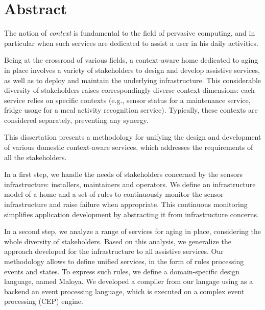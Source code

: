 \chapter*{Abstract}
\vspace*{-15mm}
\begin{center}
  \textsc{\mytitle}
\end{center}
\vspace*{-3mm}
\begin{small}
The notion of {\em context} is fundamental to the field of pervasive computing, and in particular when such services are dedicated to assist a user in his daily activities.

Being at the crossroad of various fields, a context-aware home dedicated to aging in place involves a variety of stakeholders to design and develop assistive services, as well as to deploy and maintain the underlying infrastructure. 
This considerable diversity of stakeholders raises correspondingly diverse context dimensions: each service relies on specific contexts (e.g., sensor status for a maintenance service, fridge usage for a meal activity recognition service). Typically, these contexts are considered separately, preventing any synergy.

This dissertation presents a methodology for unifying the design and development of various domestic context-aware services, which addresses the requirements of all the stakeholders. 

In a first step, we handle the needs of stakeholders concerned by the sensors infrastructure: installers, maintainers and operators. We define an infrastructure model of a home and a set of rules to continuously monitor the sensor infrastructure and raise failure when appropriate. This continuous monitoring simplifies application development by abstracting it from infrastructure concerns. 

In a second step, we analyze a range of services for aging in place, considering the whole diversity of stakeholders. Based on this analysis, we generalize the approach developed for the infrastructure to all assistive services. Our methodology allows to define unified services, in the form of rules processing events and states. To express such rules, we define a domain-specific design language, named Maloya. We developed a compiler from our langage using as a backend an event processing language, which is executed on a complex event processing (CEP) engine.


\end{small}
